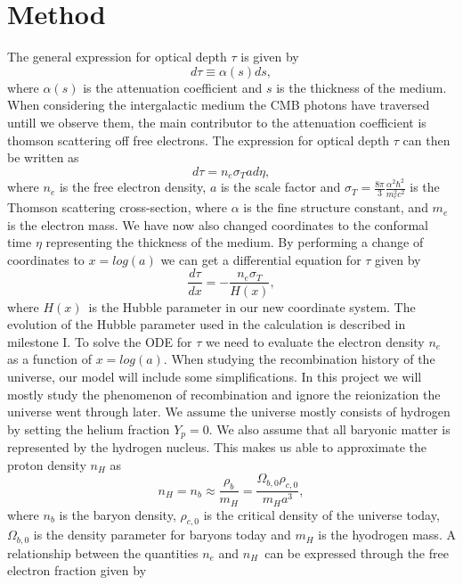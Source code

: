 \documentclass[onecolumn]{aastex62}
\begin{document}
\section{Method} \label{sec:method}
The general expression for optical depth $\tau$ is given by
\begin{equation}
    d\tau\equiv\alpha(s)ds,
\end{equation}
where $\alpha(s)$ is the attenuation coefficient and $s$ is the thickness of the medium. When considering the intergalactic medium the CMB photons have traversed untill we observe them, the main contributor to the attenuation coefficient is thomson scattering off free electrons. The expression for optical depth $\tau$ can then be written as
\begin{equation}
    d\tau=n_e\sigma_T ad\eta,
\end{equation}
where $n_e$ is the free electron density, $a$ is the scale factor and $\sigma_T = \frac{8\pi}{3}\frac{\alpha^2\hbar^2}{m_e^2c^2}$ is the Thomson scattering cross-section, where $\alpha$ is the fine structure constant, and $m_e$ is the electron mass. We have now also changed coordinates to the conformal time $\eta$ representing the thickness of the medium. By performing a change of coordinates to $x=log(a)$ we can get a differential equation for $\tau$ given by
\begin{equation}\label{eq:optical_depth_of_x}
    \frac{d\tau}{dx} = -\frac{n_e \sigma_T }{H(x)},
\end{equation}
where $H(x)$ is the Hubble parameter in our new coordinate system. The evolution of the Hubble parameter used in the calculation is described in milestone I. To solve the ODE for $\tau$ we need to evaluate the electron density $n_e$ as a function of $x=log(a)$. When studying the recombination history of the universe, our model will include some simplifications. In this project we will mostly study the phenomenon of recombination and ignore the reionization the universe went through later. We assume the universe mostly consists of hydrogen by setting the helium fraction $Y_p=0$. We also assume that all baryonic matter is represented by the hydrogen nucleus. This makes us able to approximate the proton density $n_H$ as
\begin{equation}\label{eq:baryondensity}
    n_H = n_b \approx \frac{\rho_b}{m_H} = \frac{\Omega_{b,0} \rho_{c,0}}{m_H a^3},
\end{equation}
where $n_b$ is the baryon density, $\rho_{c,0}$ is the critical density of the universe today, $\Omega_{b,0}$ is the density parameter for baryons today and $m_H$ is the hyodrogen mass. A relationship between the quantities $n_e$ and $n_H$ can be expressed through the free electron fraction given by
\end{document}
